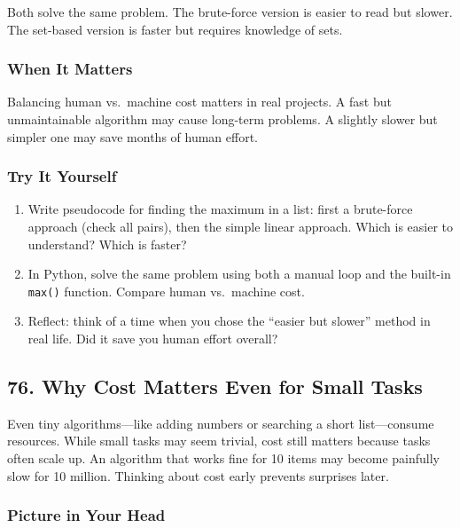 \documentclass[
  letterpaper,
  DIV=11,
  numbers=noendperiod]{scrreprt}
\providecommand{\tightlist}{%
  \setlength{\itemsep}{0pt}\setlength{\parskip}{0pt}}
\begin{document}
Both solve the same problem. The brute-force version is easier to read
but slower. The set-based version is faster but requires knowledge of
sets.

\subsubsection{When It Matters}\label{when-it-matters-73}

Balancing human vs.~machine cost matters in real projects. A fast but
unmaintainable algorithm may cause long-term problems. A slightly slower
but simpler one may save months of human effort.

\subsubsection{Try It Yourself}\label{try-it-yourself-75}

\begin{enumerate}
\def\labelenumi{\arabic{enumi}.}
\tightlist
\item
  Write pseudocode for finding the maximum in a list: first a
  brute-force approach (check all pairs), then the simple linear
  approach. Which is easier to understand? Which is faster?
\item
  In Python, solve the same problem using both a manual loop and the
  built-in \texttt{max()} function. Compare human vs.~machine cost.
\item
  Reflect: think of a time when you chose the ``easier but slower''
  method in real life. Did it save you human effort overall?
\end{enumerate}

\subsection{76. Why Cost Matters Even for Small
Tasks}\label{why-cost-matters-even-for-small-tasks}

Even tiny algorithms---like adding numbers or searching a short
list---consume resources. While small tasks may seem trivial, cost still
matters because tasks often scale up. An algorithm that works fine for
10 items may become painfully slow for 10 million. Thinking about cost
early prevents surprises later.

\subsubsection{Picture in Your Head}\label{picture-in-your-head-76}
\end{document}
